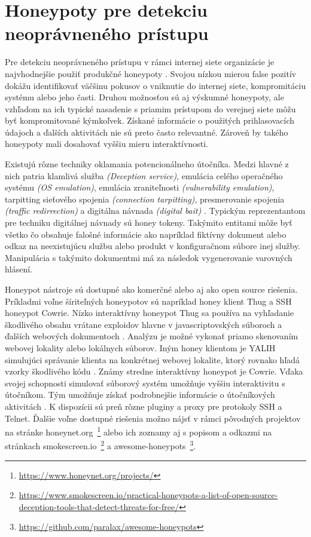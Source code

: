 \documentclass[conference, 11pt,slovak,a4paper,twoside]{IEEEtran}
\begin{document}
\section{Honeypoty pre detekciu neoprávneného prístupu} \label{honeypotsForIntrusionDetection}

Pre detekciu neoprávneného prístupu v rámci internej siete organizácie je najvhodnejšie použiť produkčné honeypoty \cite{jahankhani_analysis_2015}. Svojou nízkou mierou false pozitív dokážu identifikovať väčšinu pokusov o vniknutie do internej siete, kompromitáciu systému alebo jeho časti. Druhou možnosťou sú aj výskumné honeypoty, ale vzhľadom na ich typické nasadenie s priamim prístupom do verejnej siete môžu byť kompromitované kýmkoľvek. Získané informácie o použitých prihlasovacích údajoch a ďalších aktivitách nie sú preto často relevantné. Zároveň by takého honeypoty mali dosahovať vyššiu mieru interaktívnosti.

Existujú rôzne techniky oklamania potencionálneho útočníka. Medzi hlavné z nich patria klamlivá služba \emph{(Deception service)}, emulácia celého operačného systému \emph{(OS emulation)}, emulácia zraniteľnosti \emph{(vulnerability emulation)}, tarpitting sieťového spojenia \emph{(connection tarpitting)}, presmerovanie spojenia \emph{(traffic redirrection)} a digitálna návnada \emph{(digital bait)} \cite{qassrawi_deception_2010}. Typickým reprezentantom pre techniku digitálnej návnady sú honey tokeny. Takýmito entitami môže byť všetko čo obsahuje falošné informácie \cite{qassrawi_deception_2010} ako napríklad fiktívny dokument alebo odkaz na neexistujúcu službu alebo produkt v konfiguračnom súbore inej služby. Manipulácia s takýmito dokumentmi má za následok vygenerovanie varovných hlásení.

Honeypot nástroje sú dostupné ako komerčné alebo aj ako open source riešenia. Príkladmi voľne šíriteľných honeypotov sú napríklad honey klient Thug a SSH honeypot Cowrie. Nízko interaktívny honeypot Thug sa používa na vyhľadanie škodlivého obsahu vrátane exploidov hlavne v javascriptovských súboroch a ďalších webových dokumentoch \cite{zulkurnain_analysis_2018}. Analýzu je možné vykonať priamo skenovaním webovej lokality alebo lokálnych súborov. Iným honey klientom je YALIH simulujúci správanie klienta na konkrétnej webovej lokalite, ktorý rovnako hľadá vzorky škodlivého kódu \cite{mansoori_yalih_2014}. Známy stredne interaktívny honeypot je Cowrie. Vďaka svojej schopnosti simulovať súborový systém umožňuje vyššiu interaktivitu s útočníkom. Tým umožňuje získať podrobnejšie informácie o útočníkových aktivitách \cite{cabral_review_2019}. K dispozícii sú preň rôzne pluginy a proxy pre protokoly SSH a Telnet. Ďalšie voľne dostupné riešenia možno nájsť v rámci pôvodných projektov na stránke honeynet.org~\footnote{\url{https://www.honeynet.org/projects/}} alebo ich zoznamy aj s popisom a odkazmi na stránkach smokescreen.io~\footnote{\url{https://www.smokescreen.io/practical-honeypots-a-list-of-open-source-deception-tools-that-detect-threats-for-free/}}\cite{smokescreen_team_open_nodate} a awesome-honeypots~\footnote{\url{https://github.com/paralax/awesome-honeypots}}.
\end{document}
